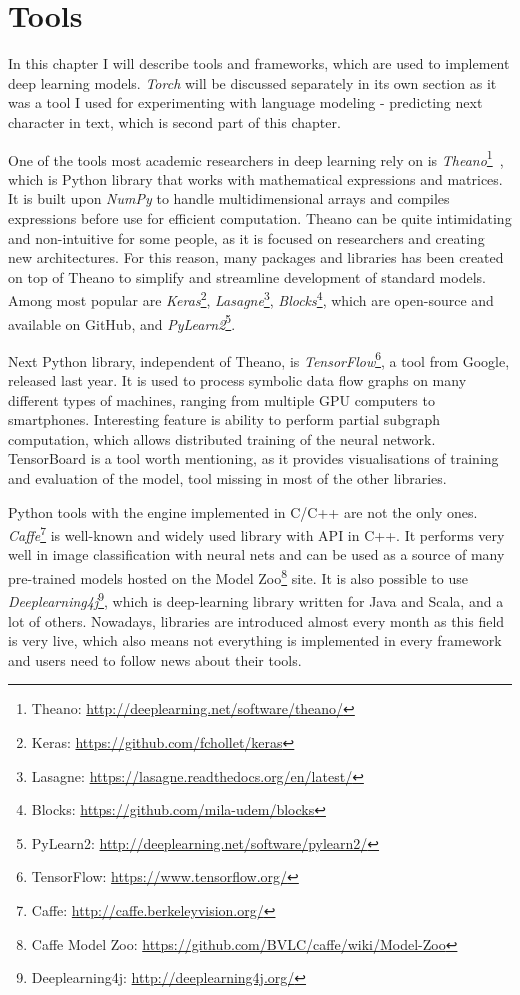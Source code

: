 	\section{Tools}\label{chp:exper}

In this chapter I will describe tools and frameworks, which are used to implement deep learning models. \emph{Torch} will be discussed separately in its own section as it was a tool I used for experimenting with language modeling - predicting next character in text, which is second part of this chapter.


One of the tools most academic researchers in deep learning rely on is \emph{Theano}\footnote{Theano: \url{http://deeplearning.net/software/theano/}}~\cite{bergstra-proc-scipy-2010}, which is Python library that works with mathematical expressions and matrices. It is built upon \emph{NumPy} to handle multidimensional arrays and compiles expressions before use for efficient computation. Theano can be quite intimidating and non-intuitive for some people, as it is focused on researchers and creating new architectures. For this reason, many packages and libraries has been created on top of Theano to simplify and streamline development of standard models. Among most popular are \emph{Keras}\footnote{Keras: \url{https://github.com/fchollet/keras}}, \emph{Lasagne}\footnote{Lasagne: \url{https://lasagne.readthedocs.org/en/latest/}}, \emph{Blocks}\footnote{Blocks: \url{https://github.com/mila-udem/blocks}}, which are open-source and available on GitHub, and \emph{PyLearn2}\footnote{PyLearn2: \url{http://deeplearning.net/software/pylearn2/}}.

Next Python library, independent of Theano, is \emph{TensorFlow}\footnote{TensorFlow: \url{https://www.tensorflow.org/}}, a tool from Google, released last year. It is used to process symbolic data flow graphs on many different types of machines, ranging from multiple GPU computers to smartphones. Interesting feature is ability to perform partial subgraph computation, which allows distributed training of the neural network. TensorBoard is a tool worth mentioning, as it provides visualisations of training and evaluation of the model, tool missing in most of the other libraries.

Python tools with the engine implemented in C/C++ are not the only ones. \emph{Caffe}\footnote{Caffe: \url{http://caffe.berkeleyvision.org/}} is well-known and widely used library with API in C++. It performs very well in image classification with neural nets and can be used as a source of many pre-trained models hosted on the Model Zoo\footnote{Caffe Model Zoo: \url{https://github.com/BVLC/caffe/wiki/Model-Zoo}} site. It is also possible to use \emph{Deeplearning4j}\footnote{Deeplearning4j: \url{http://deeplearning4j.org/}}, which is deep-learning library written for Java and Scala, and a lot of others. Nowadays, libraries are introduced almost every month as this field is very live, which also means not everything is implemented in every framework and users need to follow news about their tools.

